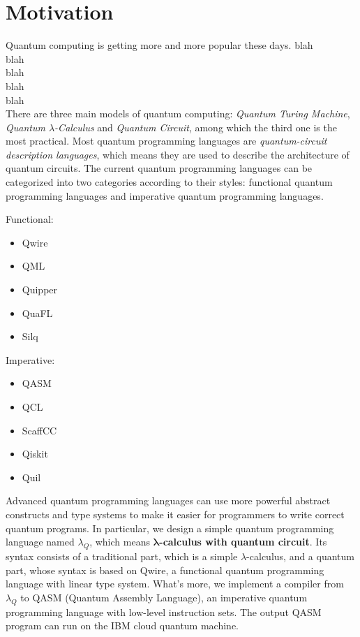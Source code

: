 \section{Motivation}
Quantum computing is getting more and more popular these days.
blah\\
blah\\
blah\\
blah\\
blah\\

There are three main models of quantum computing: \textit{Quantum Turing Machine}, \textit{Quantum $\lambda$-Calculus} and \textit{Quantum Circuit}, among which the third one is the most practical.
Most quantum programming languages are \textit{quantum-circuit description languages}, which means they are used to describe the architecture of quantum circuits.
The current quantum programming languages can be categorized into two categories according to their styles: functional quantum programming languages and imperative quantum programming languages.
\begin{multicols}{2}
  \begin{center}
      Functional:
  \end{center}
\begin{itemize}
    \item Qwire
    \item QML
    \item Quipper
    \item QuaFL
    \item Silq
\end{itemize}

  \columnbreak

  \begin{center}
          Imperative:
  \end{center}
\begin{itemize}
    \item QASM
    \item QCL
    \item ScaffCC
    \item Qiskit
    \item Quil
\end{itemize}
\end{multicols}

Advanced quantum programming languages can use more powerful abstract constructs and type systems to make it easier for programmers to write correct quantum programs.
In particular, we design a simple quantum programming language named $\lambda_Q$, which means \textbf{$\boldsymbol{\lambda}$-calculus with quantum circuit}.
Its syntax consists of a traditional part, which is a simple $\lambda$-calculus, and a quantum part, whose syntax is based on Qwire, a functional quantum programming language with linear type system.
What's more, we implement a compiler from $\lambda_Q$ to QASM (Quantum Assembly Language), an imperative quantum programming language with low-level instruction sets.
The output QASM program can run on the IBM cloud quantum machine.

